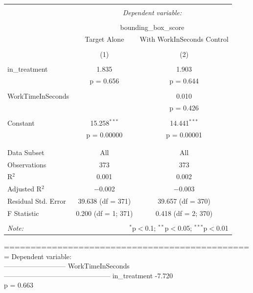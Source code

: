 \documentclass[
]{article}
\begin{document}
\begin{table}[h] \centering 
  \caption{} 
  \label{} 
\begin{tabular}{@{\extracolsep{5pt}}lcc} 
\\[-1.8ex]\hline 
\hline \\[-1.8ex] 
 & \multicolumn{2}{c}{\textit{Dependent variable:}} \\ 
\cline{2-3} 
\\[-1.8ex] & \multicolumn{2}{c}{bounding\_box\_score} \\ 
 & Target Alone & With WorkInSeconds Control \\ 
\\[-1.8ex] & (1) & (2)\\ 
\hline \\[-1.8ex] 
 in\_treatment & 1.835 & 1.903 \\ 
  & p = 0.656 & p = 0.644 \\ 
  & & \\ 
 WorkTimeInSeconds &  & 0.010 \\ 
  &  & p = 0.426 \\ 
  & & \\ 
 Constant & 15.258$^{***}$ & 14.441$^{***}$ \\ 
  & p = 0.00000 & p = 0.00001 \\ 
  & & \\ 
\hline \\[-1.8ex] 
Data Subset & All & All \\ 
Observations & 373 & 373 \\ 
R$^{2}$ & 0.001 & 0.002 \\ 
Adjusted R$^{2}$ & $-$0.002 & $-$0.003 \\ 
Residual Std. Error & 39.638 (df = 371) & 39.657 (df = 370) \\ 
F Statistic & 0.200 (df = 1; 371) & 0.418 (df = 2; 370) \\ 
\hline 
\hline \\[-1.8ex] 
\textit{Note:}  & \multicolumn{2}{r}{$^{*}$p$<$0.1; $^{**}$p$<$0.05; $^{***}$p$<$0.01} \\ 
\end{tabular} 
\end{table}

=============================================== Dependent variable:\\
--------------------------- WorkTimeInSeconds\\
----------------------------------------------- in\_treatment -7.720\\
p = 0.663
\end{document}

